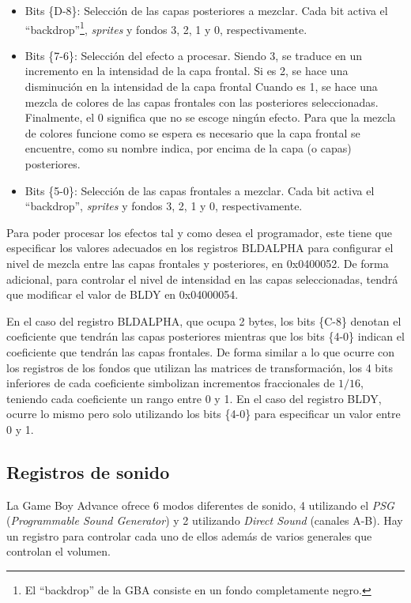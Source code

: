 \begin{itemize}
	\item Bits \{D-8\}: Selección de las capas posteriores a mezclar. Cada bit activa el ``backdrop''\footnote{El ``backdrop'' de la GBA consiste en un fondo completamente negro.}, \textit{sprites} y fondos 3, 2, 1 y 0, respectivamente.
	\item Bits \{7-6\}: Selección del efecto a procesar. Siendo 3, se traduce en un incremento en la intensidad de la capa frontal. Si es 2, se hace una disminución en la intensidad de la capa frontal Cuando es 1, se hace una mezcla de colores de las capas frontales con las posteriores seleccionadas. Finalmente, el 0 significa que no se escoge ningún efecto. Para que la mezcla de colores funcione como se espera es necesario que la capa frontal se encuentre, como su nombre indica, por encima de la capa (o capas) posteriores. 
	\item Bits \{5-0\}: Selección de las capas frontales a mezclar. Cada bit activa el ``backdrop'', \textit{sprites} y fondos 3, 2, 1 y 0, respectivamente.
\end{itemize}

Para poder procesar los efectos tal y como desea el programador, este tiene que especificar los valores adecuados en los registros BLDALPHA para configurar el nivel de mezcla entre las capas frontales y posteriores, en 0x0400052. De forma adicional, para controlar el nivel de intensidad en las capas seleccionadas, tendrá que modificar el valor de BLDY en 0x04000054.

En el caso del registro BLDALPHA, que ocupa 2 bytes, los bits \{C-8\} denotan el coeficiente que tendrán las capas posteriores mientras que los bits \{4-0\} indican el coeficiente que tendrán las capas frontales. De forma similar a lo que ocurre con los registros de los fondos que utilizan las matrices de transformación, los 4 bits inferiores de cada coeficiente simbolizan incrementos fraccionales de $1/16$, teniendo cada coeficiente un rango entre 0 y 1. En el caso del registro BLDY, ocurre lo mismo pero solo utilizando los bits \{4-0\} para especificar un valor entre 0 y 1.

\subsection{Registros de sonido}

La Game Boy Advance ofrece 6 modos diferentes de sonido, 4 utilizando el \textit{PSG} (\textit{Programmable Sound Generator}) y 2 utilizando \textit{Direct Sound} (canales A-B). Hay un registro para controlar cada uno de ellos además de varios generales que controlan el volumen.

